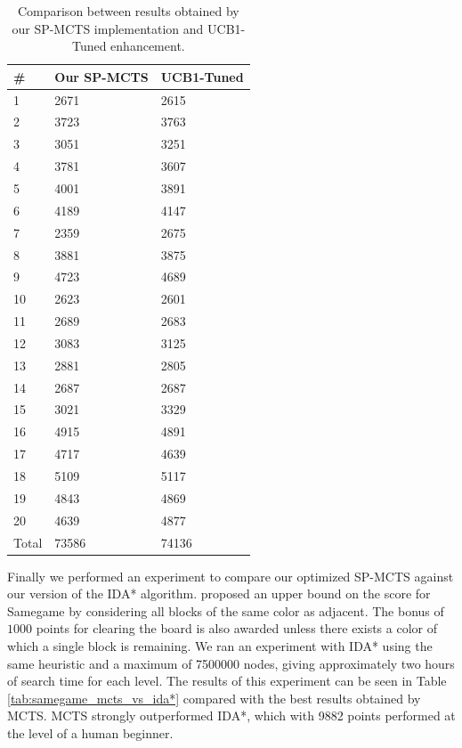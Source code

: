\begin{table}[!h]
    \centering
    \begin{tabular}{ l | l | l }
          \# & Our SP-MCTS & UCB1-Tuned \\
          \hline			
          1 & 2671 & 2615 \\
          2 & 3723 & 3763\\
          3 & 3051 & 3251\\
          4 & 3781 & 3607\\
          5 & 4001 & 3891\\
          6 & 4189 & 4147\\
          7 & 2359 & 2675\\
          8 & 3881 & 3875\\
          9 & 4723 & 4689\\
          10 & 2623 & 2601\\
          11 & 2689 & 2683\\
          12 & 3083 & 3125\\
          13 & 2881 & 2805\\
          14 & 2687 & 2687\\
          15 & 3021 & 3329\\
          16 & 4915 & 4891\\
          17 & 4717 & 4639\\
          18 & 5109 & 5117\\
          19 & 4843 & 4869\\
          20 & 4639 & 4877\\
          \hline  
          Total & 73586 & 74136\\
          \hline 
    \end{tabular}
    \caption[SP-MCTS versus UCB1-Tuned in Samegame]{Comparison between results obtained by our SP-MCTS implementation and UCB1-Tuned enhancement.}
    \label{tab:samegame_optresults}
\end{table}

\medskip\noindent
Finally we performed an experiment to compare our optimized SP-MCTS against our version of the IDA* algorithm. \cite{DBLP:journals/kbs/SchaddWTU12} proposed an upper bound on the score for Samegame by considering all blocks of the same color as adjacent. The bonus of $1000$ points for clearing the board is also awarded unless there exists a color of which a single block is remaining. We ran an experiment with IDA* using the same heuristic and a maximum of 7500000 nodes, giving approximately two hours of search time for each level. The results of this experiment can be seen in Table \ref{tab:samegame_mcts_vs_ida*} compared with the best results obtained by MCTS. MCTS strongly outperformed IDA*, which with 9882 points performed at the level of a human beginner.

